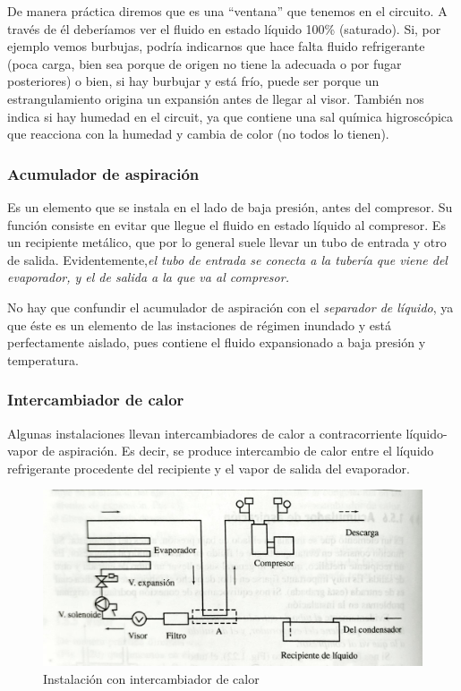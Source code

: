 De manera práctica diremos que es una ``ventana'' que tenemos en el circuito. A través de él deberíamos ver el fluido en estado líquido 100\% (saturado). Si, por ejemplo vemos burbujas, podría indicarnos que hace falta fluido refrigerante (poca carga, bien sea porque de origen no tiene la adecuada o por fugar posteriores) o bien, si hay burbujar y está frío, puede ser porque un estrangulamiento origina un expansión antes de llegar al visor. También nos indica si hay humedad en el circuit, ya que contiene una sal química higroscópica que reacciona con la humedad y cambia de color (no todos lo tienen).

\subsubsection{Acumulador de aspiración}

Es un elemento que se instala en el lado de baja presión, antes del compresor. Su función consiste en evitar que llegue el fluido en estado líquido al compresor. Es un recipiente metálico, que por lo general suele llevar un tubo de entrada y otro de salida. Evidentemente,\textit{el tubo de entrada se conecta a la tubería que viene del evaporador, y el de salida a la que va al compresor.}

No hay que confundir el acumulador de aspiración con el \textit{separador de líquido}, ya que éste es un elemento de las instaciones de régimen inundado y está perfectamente aislado, pues contiene el fluido expansionado a baja presión y temperatura.

\subsubsection{Intercambiador de calor}

Algunas instalaciones llevan intercambiadores de calor a contracorriente líquido-vapor de aspiración. Es decir, se produce intercambio de calor entre el líquido refrigerante procedente del recipiente y el vapor de salida del evaporador.

\begin{figure}[H]
	\centering
	\includegraphics[width=\textwidth]{figuras/instalación con intercambiador.jpg}
	\caption{Instalación con intercambiador de calor}
	\label{fig:Instalación con intercambiador de calor}
\end{figure}

